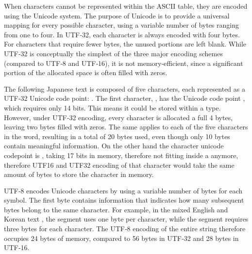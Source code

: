 


 When characters cannot be represented within the ASCII table, they are encoded
using the Unicode system. The purpose of Unicode is to provide a universal
mapping for every possible character, using a variable number of bytes ranging
from one to four. In UTF‑32, each character is always encoded with four bytes.
For characters that require fewer bytes, the unused portions are left blank.
While UTF‑32 is conceptually the simplest of the three major encoding schemes
(compared to UTF‑8 and UTF‑16), it is not memory‑efficient, since a significant
portion of the allocated space is often filled with zeros.



The following Japanese text \colorbox{background!90!gray!60}{}
is composed of five characters, each represented as a UTF‑32
Unicode code point: . The first
character, \colorbox{background!90!gray!60}{}, has the Unicode code point
, which requires only 14 bits. This means it could be stored
within a  type. However, under UTF‑32 encoding, every character is
allocated a full 4 bytes, leaving two bytes filled with zeros. The same
applies to each of the five characters in the word, resulting in a total of 20
bytes used, even though only 10 bytes contain meaningful information. On the other hand the character  unicode codepoint is ,
taking 17 bits in memory, therefore not fitting inside a  anymore,
therefore UTF16 and UTF32 encoding of that character would take the same
amount of bytes to store the character in memory.



UTF‑8 encodes Unicode characters by using a variable number of bytes for each
symbol. The first byte contains information that indicates how many subsequent
bytes belong to the same character. For example, in the mixed English and Korean
text \colorbox{background!90!gray!60}{}, the segment \colorbox{background!90!gray!60}{} uses one
byte per character, while the segment \colorbox{background!90!gray!60}{\korean{\color{black!30!applegreen}{"안녕하세요"}}} requires three bytes
for each character. The UTF‑8 encoding of the entire string therefore occupies
24 bytes of memory, compared to 56 bytes in UTF‑32 and 28 bytes in UTF‑16.


